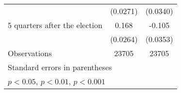 \begin{table}[htbp]
\begin{tabular}{l*{2}{c}}
                    &    (0.0271)         &    (0.0340)         \\
[1em]
 5 quarters after the election&       0.168\sym{***}&      -0.105\sym{**} \\
                    &    (0.0264)         &    (0.0353)         \\
\hline
Observations        &       23705         &       23705         \\
\hline\hline
\multicolumn{3}{l}{\footnotesize Standard errors in parentheses}\\
\multicolumn{3}{l}{\footnotesize \sym{*} \(p<0.05\), \sym{**} \(p<0.01\), \sym{***} \(p<0.001\)}\\
\end{tabular}
\end{table}
